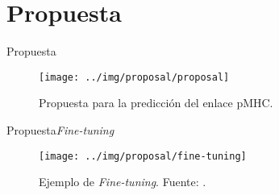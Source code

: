 \documentclass[10pt]{beamer}
\newcommand{\1}{
	\setbeamertemplate{background}{
		\texttt{[image: img/1]}
		\tikz[overlay] \fill[fill opacity=0.75,fill=white] (0,0) rectangle (-\paperwidth,\paperheight);
	}
}
\begin{document}
\section{Propuesta}

\begin{frame}{Propuesta}{}

	\begin{figure}[H]
		\centering
		\texttt{[image: ../img/proposal/proposal]}	
		\caption{Propuesta para la predicción del enlace pMHC.}
		\label{fig:neo_det_seq}
	\end{figure}
\end{frame}


\begin{frame}{Propuesta}{\textit{Fine-tuning}}
	
	\begin{figure}
		\centering
		\texttt{[image: ../img/proposal/fine-tuning]}	
		\caption{Ejemplo de \textit{Fine-tuning}. Fuente: \cite{prince2023understanding}.}		
	\end{figure}
	
\end{frame}
\end{document}
